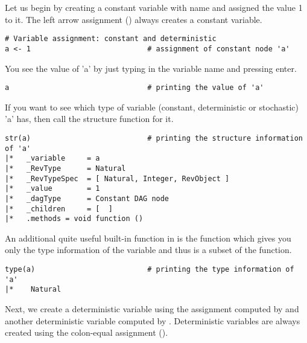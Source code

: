 Let us begin by creating a constant variable with name  and assigned the value 1 to it. 
The left arrow assignment (\cl{<-}) always creates a constant variable.
{\tt \begin{snugshade*}
\begin{lstlisting}    
# Variable assignment: constant and deterministic
a <- 1                           # assignment of constant node 'a'
\end{lstlisting}
\end{snugshade*}}
You see the value of 'a' by just typing in the variable name and pressing enter.
{\tt \begin{snugshade*}
\begin{lstlisting}    
a                                # printing the value of 'a'
\end{lstlisting}
\end{snugshade*}}
If you want to see which type of variable (constant, deterministic or stochastic) 'a' has, then call the structure function for it.
{\tt \begin{snugshade*}
\begin{lstlisting}    
str(a)                           # printing the structure information of 'a'
|*   _variable     = a
|*   _RevType      = Natural
|*   _RevTypeSpec  = [ Natural, Integer, RevObject ]
|*   _value        = 1
|*   _dagType      = Constant DAG node
|*   _children     = [  ]
|*   .methods = void function ()
\end{lstlisting}
\end{snugshade*}}
An additional quite useful built-in function in \RevBayes  is the  function which gives you only the type information of the variable and thus is a subset of the  function.
{\tt \begin{snugshade*}
\begin{lstlisting}    
type(a)                          # printing the type information of 'a'
|*    Natural
\end{lstlisting}
\end{snugshade*}}
Next, we create a deterministic variable  using the \cl{:=} assignment computed by  and another deterministic variable  computed by . 
Deterministic variables are always created using the colon-equal assignment (\cl{:=}). 

